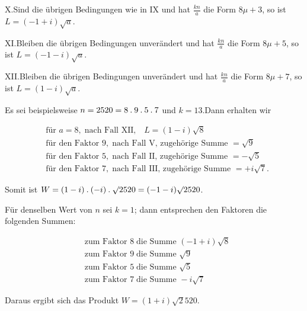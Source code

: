 X.\quad Sind die übrigen Bedingungen wie in IX und hat $\frac{kn}{a}$ die Form $8\mu+3$, so ist $L=(-1+i)\surd a$.

XI.\quad Bleiben die übrigen Bedingungen unverändert und hat $\frac{kn}{a}$ die Form $8\mu+5$, so ist $L=(-1-i)\surd a$.

XII.\quad Bleiben die übrigen Bedingungen unverändert und hat $\frac{kn}{a}$ die Form $8\mu+7$, so ist $L=(1-i)\surd a$.


Es sei beispielsweise $n=2520=8\mathbin{.}9\mathbin{.}5\mathbin{.}7$ und $k=13$.\quad Dann erhalten wir

{\small
\[
\begin{aligned}
&\text{für }a=8,\;\text{nach Fall XII,}\quad L=(1-i)\surd8\\
&\text{für den Faktor }9,\;\text{nach Fall V, zugehörige Summe }=\surd9\\
&\text{für den Faktor }5,\;\text{nach Fall II, zugehörige Summe }=-\surd5\\
&\text{für den Faktor }7,\;\text{nach Fall III, zugehörige Summe }=+i\surd7\mathord{.}
\end{aligned}
\]
}

Somit ist $W=(1-i)\mathbin{.}(-i)\mathbin{.}\surd2520=(-1-i)\surd2520$.

Für denselben Wert von $n$ sei $k=1$; dann entsprechen den Faktoren die folgenden Summen:

\[
\begin{aligned}
&\text{zum Faktor }8\;\text{die Summe }(-1+i)\surd8\\
&\text{zum Faktor }9\;\text{die Summe }\surd9\\
&\text{zum Faktor }5\;\text{die Summe }\surd5\\
&\text{zum Faktor }7\;\text{die Summe }-i\surd7
\end{aligned}
\]

Daraus ergibt sich das Produkt $W=(1+i)\surd2520$.
